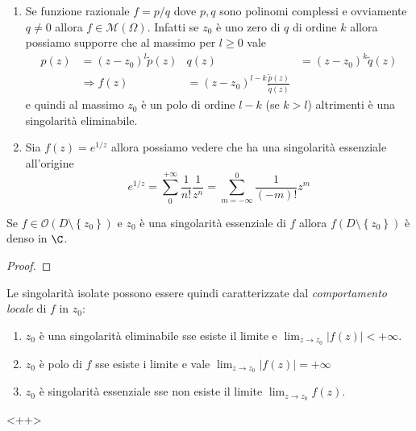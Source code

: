 \begin{example}
  \begin{enumerate}
    \item Se funzione razionale $f= p / q$ dove $p,q$ sono polinomi complessi
      e ovviamente $q \neq 0$ allora $f \in \mathcal{M}(\Omega)$. Infatti se
      $z_0$ è uno zero di $q$ di ordine $k$ allora possiamo supporre che al
      massimo per $l \ge 0$ vale 
      \begin{align*}
        p(z) & = (z-z_0)^l \tilde{p}(z) & q(z) & = (z-z_0)^k \tilde{q}(z) \\
        & \Longrightarrow f(z) & = (z-z_0)^{l-k}
        \frac{\tilde{p}(z)}{\tilde{q}(z)} &
      \end{align*}
      e quindi al massimo $z_0$ è un polo di ordine $l-k$ (se $k > l$)
      altrimenti è una singolarità eliminabile. 
    \item Sia $f(z) = e^{1/z}$ allora possiamo vedere che ha una singolarità
      essenziale all'origine
      \begin{equation*}
        e^{1/z} = \sum_{0}^{+\infty} \frac{1}{n!}\frac{1}{z^n} = \sum_{m
        = -\infty}^{0} \frac{1}{(-m)!} z^m 
      \end{equation*}
  \end{enumerate}
\end{example}

\begin{theorem}
    Se $f \in \mathcal{O}(D \setminus \left\{z_0  \right\})$ e $z_0$ è una
    singolarità essenziale di $f$ allora $f(D \setminus \left\{ z_0 \right\})$
    è denso in $\C$.
  \label{thr:casorati_weierstrass}
\end{theorem}
\begin{proof}
\end{proof}


\begin{remark}
  Le singolarità isolate possono essere quindi caratterizzate dal
  \emph{comportamento locale} di $f$ in $z_0$: 
  \begin{enumerate}
    \item $z_0$ è una singolarità eliminabile sse esiste il limite e 
      $\lim_{z \to z_0} |f(z)| < +\infty$.
    \item $z_0$ è polo di $f$ sse esiste i limite e vale $\lim_{z\to
      z_0}|f(z)| = +\infty$
    \item $z_0$ è singolarità essenziale sse non esiste il limite
      $\lim_{z \to z_0} f(z)$. 
  \end{enumerate}
  \label{<+label+>}
\end{remark}<++>
